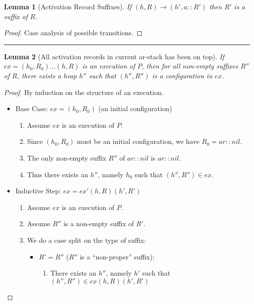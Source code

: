 \documentclass[a4paper,11pt]{article}
\newtheorem{lemma}{Lemma}
\newcommand{\ex}{\mathit{ex}}
\newcommand{\ar}{\mathit{ar}}
\newcommand{\sect}[1]{\noindent\parbox{\textwidth}{#1}}
\newcommand{\sep}{\hspace{-1.5707965cm}\rule{\paperwidth}{1pt}}
\begin{document}
\sect{\begin{lemma}[Activation Record Suffixes]\label{lem:ar_suffixes}
If $(h, R) \rightarrow (h', a::R')$ then $R'$ is a suffix of $R$.
\end{lemma}
\begin{proof} Case analysis of possible transitions.\end{proof}
}


\sep


\sect{\begin{lemma}[All activation records in current ar-stack has been on top]\label{lem:all_suffs_in_ex}
If $\ex = (h_0, R_0)\ldots (h,R)$ is an execution of $P$, then for all non-empty suffixes $R''$ of $R$, there exists a heap $h''$ such that $(h'', R'')$ is a configuration in $\ex$.
\end{lemma}
\begin{proof} By induction on the structure of an execution.
\begin{itemize}
\item Base Case: $\ex = (h_0, R_0)$ (an initial configuration)
  \begin{enumerate}
  \item Assume $\ex$ is an execution of $P$.
  \item Since $(h_0, R_0)$ must be an initial configuration, we have $R_0 = \ar :: nil$.
  \item The only non-empty suffix $R''$ of $\ar::nil$ is $\ar::nil$.
  \item Thus there exists an $h''$, namely $h_0$ such that $(h'', R'') \in \ex$.
  \end{enumerate}
\item Inductive Step: $\ex = \ex'(h,R)(h', R')$
  \begin{enumerate}
  \item Assume $\ex$ is an execution of $P$.
  \item Assume $R''$ is a non-empty suffix of $R'$.
  \item We do a case split on the type of suffix:
    \begin{itemize}
      \item $R' = R''$ ($R''$ is a ``non-proper'' suffix):
        \begin{enumerate}
        \item There exists an $h''$, namely $h'$ such that $(h'', R'') \in \ex(h,R)(h', R')$
        \end{enumerate}

\end{itemize}
\end{enumerate}
\end{itemize}
\end{proof}}
\end{document}
